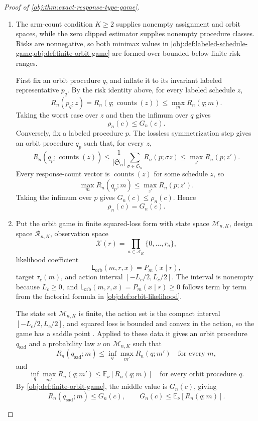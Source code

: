 \documentclass[11pt]{article}
\begin{document}
\begin{proof}[Proof of \cref{obj:thm:exact-response-type-game}]
\begin{enumerate}
\item The arm-count condition \(K\ge2\) supplies nonempty assignment and orbit spaces, while the zero clipped estimator supplies nonempty procedure classes.  Risks are nonnegative, so both minimax values in \cref{obj:def:labeled-schedule-game,obj:def:finite-orbit-game} are formed over bounded-below finite risk ranges.

First fix an orbit procedure \(q\), and inflate it to its invariant labeled representative \(p_q\).  By the risk identity above, for every labeled schedule \(z\),
\[
R_n(p_q;z)=R_n(q;\operatorname{counts}(z))
\le
\max_m R_n(q;m).
\]
Taking the worst case over \(z\) and then the infimum over \(q\) gives
\[
\rho_n(c)\le G_n(c).
\]
Conversely, fix a labeled procedure \(p\).  The lossless symmetrization step gives an orbit procedure \(q_p\) such that, for every \(z\),
\[
R_n(q_p;\operatorname{counts}(z))
\le
\frac{1}{|\mathfrak S_n|}
\sum_{\sigma\in\mathfrak S_n}R_n(p;\sigma z)
\le
\max_{z'}R_n(p;z').
\]
Every response-count vector is \(\operatorname{counts}(z)\) for some schedule \(z\), so
\[
\max_m R_n(q_p;m)\le \max_{z'}R_n(p;z').
\]
Taking the infimum over \(p\) gives \(G_n(c)\le\rho_n(c)\).  Hence
\[
\rho_n(c)=G_n(c).
\] %

\item Put the orbit game in finite squared-loss form with state space \(\mathcal M_{n,K}\), design space \(\mathcal R_{n,K}\), observation space
\[
\mathcal X(r)=\prod_{a\in\mathcal A_K}\{0,\ldots,r_a\},
\]
likelihood coefficient
\[
\mathsf L_{\mathrm{orb}}(m,r,x)=P_m(x\mid r),
\]
target \(\tau_c(m)\), and action interval \([-L_c/2,L_c/2]\).  The interval is nonempty because \(L_c\ge0\), and \(\mathsf L_{\mathrm{orb}}(m,r,x)=P_m(x\mid r)\ge0\) follows term by term from the factorial formula in \cref{obj:def:orbit-likelihood}.

The state set \(\mathcal M_{n,K}\) is finite, the action set is the compact interval \([-L_c/2,L_c/2]\), and squared loss is bounded and convex in the action, so the game has a saddle point \citep{wald_1950}.  Applied to these data it gives an orbit procedure \(q_{\mathrm{sad}}\) and a probability law \(\nu\) on \(\mathcal M_{n,K}\) such that
\[
R_n(q_{\mathrm{sad}};m)\le
\inf_q\max_{m'}R_n(q;m')
\quad\text{for every }m,
\]
and
\[
\inf_q\max_{m'}R_n(q;m')
\le
\mathbb E_{\nu}\!\left[R_n(q;m)\right]
\quad\text{for every orbit procedure }q.
\]
By \cref{obj:def:finite-orbit-game}, the middle value is \(G_n(c)\), giving
\[
R_n(q_{\mathrm{sad}};m)\le G_n(c),
\qquad
G_n(c)\le \mathbb E_{\nu}\!\left[R_n(q;m)\right].
\] %
\end{enumerate}
\end{proof}
\end{document}
